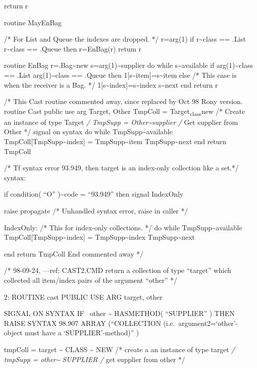 return r

routine MayEnBag

/* For List and Queue the indexes are dropped. */ r=arg(1) if
r\textasciitilde class == .List \textbar{} r\textasciitilde class ==
.Queue then r=EnBag(r) retum r

routine EnBag r=.Bag\textasciitilde new s=arg(1)\textasciitilde supplier
do while s\textasciitilde available if arg(1)\textasciitilde class ==
.List \textbar{} arg(1)\textasciitilde class == .Queue then
1{[}s\textasciitilde item{]}=s\textasciitilde item else /* This case is
when the receiver is a Bag. */
1{[}s\textasciitilde index{]}=s\textasciitilde index
s\textasciitilde next end return r

/* This Cast routine commented away, since replaced by Oct 98 Rony
version. routine Cast public use arg Target, Other TmpColl =
Target\textsubscript{class}new /* Create an instance of type Target
\emph{/ TmpSupp = Other\textasciitilde supplier /} Get supplier from
Other */ signal on syntax do while TmpSupp\textasciitilde available
TmpColl{[}TmpSupp\textasciitilde index{]} = TmpSupp\textasciitilde item
TmpSupp\textasciitilde next end return TmpColl

/* Tf syntax error 93.949, then target is an index-only collection like
a set.*/ syntax:

if condition( ``O'' )\textasciitilde code = ``93.949'' then signal
IndexOnly

raise propagate /* Unhandled syntax error, raise in caller */

IndexOnly: /* This for index-only collections. */ do while
TmpSupp\textasciitilde available
TmpColl{[}TmpSupp\textasciitilde index{]} = TmpSupp\textasciitilde index
TmpSupp\textasciitilde next

end return TmpColl End commented away */

/* 98-09-24, ---ref; CAST2.CMD return a collection of type ``target''
which collected all item/index pairs of the argument ``other'' */

2: ROUTINE cast PUBLIC USE ARG target, other

SIGNAL ON SYNTAX IF ~other \textasciitilde{} HASMETHOD( ``SUPPLIER'' )
THEN RAISE SYNTAX 98.907 ARRAY (``COLLECTION
(i.e.~argument2=`other'-object must have a `SUPPLIER'-method)'' )

tmpColl = target \textasciitilde{} CLASS \textasciitilde{} NEW /* create
a an instance of type target \emph{/ tmpSupp = other\textasciitilde{}
SUPPLIER /} get supplier from other */

